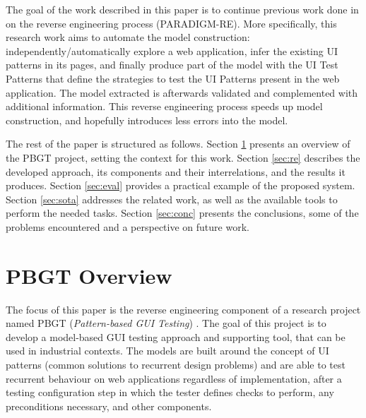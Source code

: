 \documentclass[10pt, conference, compsocconf]{IEEEtran}
\begin{document}
The goal of the work described in this paper is to continue previous work done in \cite{nabuco2013inferring} on the reverse engineering process (PARADIGM-RE). More specifically, this research work aims to automate the model construction: independently/automatically explore a web application, infer the existing UI patterns in its pages, and finally produce part of the model with the UI Test Patterns that define the strategies to test the UI Patterns present in the web application. The model extracted is afterwards validated and complemented with additional information. This reverse engineering process speeds up model construction, and hopefully introduces less errors into the model.

The rest of the paper is structured as follows. Section \ref{sec:pbgt} presents an overview of the PBGT project, setting the context for this work.  Section \ref{sec:re} describes the developed approach, its components and  their interrelations, and the results it produces. Section \ref{sec:eval} provides a practical example of the proposed system. Section \ref{sec:sota} addresses the related work, as well as the available tools to perform the needed tasks. Section \ref{sec:conc} presents the conclusions, some of the problems encountered and a perspective on future work. 

\section{PBGT Overview}\label{sec:pbgt}

The focus of this paper is the reverse engineering component of a research project named PBGT (\textit{Pattern-based GUI Testing}) \cite{moreira2013pattern}. The goal of this project is to develop a model-based GUI testing approach and supporting tool, that can be used in industrial contexts. The models are built around the concept of UI patterns (common solutions to recurrent design problems) and are able to test recurrent behaviour on web applications regardless of implementation, after a testing configuration step in which the tester defines checks to perform, any preconditions necessary, and other components.
\end{document}
